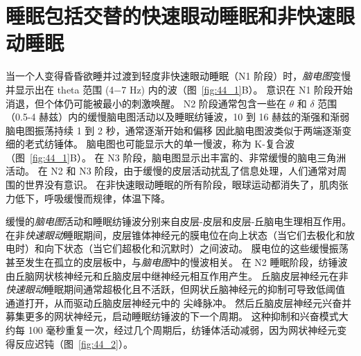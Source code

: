 \section{睡眠包括交替的快速眼动睡眠和非快速眼动睡眠}

当一个人变得昏昏欲睡并过渡到轻度非快速眼动睡眠（N1 阶段）时，\textit{脑电图}变慢并显示出在 theta 范围 (4−7 Hz) 内的波（图~\ref{fig:44_1}B）。
意识在 N1 阶段开始消退，但个体仍可能被最小的刺激唤醒。
N2 阶段通常包含一些在 $ \theta $ 和 $ \delta $ 范围（0.5-4 赫兹）内的缓慢脑电图活动以及睡眠纺锤波，10 到 16 赫兹的渐强和渐弱脑电图振荡持续 1 到 2 秒，通常逐渐开始和偏移 因此脑电图波类似于两端逐渐变细的老式纺锤体。
脑电图也可能显示大的单一慢波，称为 K-复合波（图~\ref{fig:44_1}B）。
在 N3 阶段，脑电图显示出丰富的、非常缓慢的脑电三角洲活动。
在 N2 和 N3 阶段，由于缓慢的皮层活动扰乱了信息处理，人们通常对周围的世界没有意识。
在非快速眼动睡眠的所有阶段，眼球运动都消失了，肌肉张力低下，呼吸缓慢而规律，体温下降。


缓慢的\textit{脑电图}活动和睡眠纺锤波分别来自皮层-皮层和皮层-丘脑电生理相互作用。
在非\textit{快速眼动}睡眠期间，皮层锥体神经元的膜电位在向上状态（当它们去极化和放电时）和向下状态（当它们超极化和沉默时）之间波动。
膜电位的这些缓慢振荡甚至发生在孤立的皮层板中，与\textit{脑电图}中的慢波相关。
在 N2 睡眠阶段，纺锤波由丘脑网状核神经元和丘脑皮层中继神经元相互作用产生。
丘脑皮层神经元在非\textit{快速眼动}睡眠期间通常超极化且不活跃，但网状丘脑神经元的抑制可导致低阈值  通道打开，从而驱动丘脑皮层神经元中的  尖峰脉冲。
然后丘脑皮层神经元兴奋并募集更多的网状神经元，启动睡眠纺锤波的下一个周期。
这种抑制和兴奋模式大约每 100 毫秒重复一次，经过几个周期后，纺锤体活动减弱，因为网状神经元变得反应迟钝（图~\ref{fig:44_2}）。


